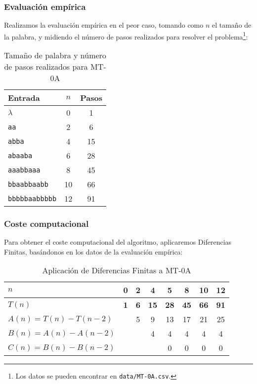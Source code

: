 \subsubsection*{Evaluación empírica}
Realizamos la evaluación empírica en el peor caso, tomando como $n$ el tamaño de la palabra, y midiendo el número de pasos realizados para resolver el problema\footnote{Los datos se pueden encontrar en \texttt{data/MT-0A.csv}.}:

\begin{table}[h]
    \centering
    \begin{tabular}{lcc}
        Entrada & $n$ & Pasos \\
        \hline
        $\lambda$               & 0  & 1  \\
        \texttt{aa}             & 2  & 6  \\
        \texttt{abba}           & 4  & 15 \\
        \texttt{abaaba}         & 6  & 28 \\
        \texttt{aaabbaaa}       & 8  & 45 \\
        \texttt{bbaabbaabb}     & 10 & 66 \\
        \texttt{bbbbbaabbbbb}   & 12 & 91
    \end{tabular}
    \caption{Tamaño de palabra y número de pasos realizados para MT-0A}
\end{table}


\subsubsection*{Coste computacional}
Para obtener el coste computacional del algoritmo, aplicaremos Diferencias Finitas, basándonos en los datos de la evaluación empírica:

\begin{table}[H]
    \centering
    \begin{tabular}{|l|c|c|c|c|c|c|c|}
        \hline
        $n$ & \textbf{0} & \textbf{2} & \textbf{4} & \textbf{5} & \textbf{8} & \textbf{10} & \textbf{12} \\ \hline
        $T(n)$ & \textbf{1} & \textbf{6} & \textbf{15} & \textbf{28} & \textbf{45} & \textbf{66} & \textbf{91} \\ \hline
        \hline
        $A(n) = T(n) - T(n-2)$ &    &  5 &  9 & 13 & 17 & 21 & 25 \\ \hline
        $B(n) = A(n) - A(n-2)$ &    &    &  4 &  4 &  4 &  4 &  4 \\ \hline
        $C(n) = B(n) - B(n-2)$ &    &    &    &  0 &  0 &  0 &  0 \\ \hline
    \end{tabular}
    \label{tab:0A}
    \caption{Aplicación de Diferencias Finitas a MT-0A}
\end{table}

